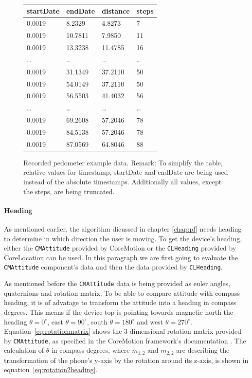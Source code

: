 \begin{center}
\begin{figure}
\begin{tabular}{*{4}{l}}
startDate & endDate & distance & steps\\
\hline
0.0019 & 8.2329 & 4.8273 & 7\\
0.0019 & 10.7811 & 7.9850 & 11\\
0.0019 & 13.3238 & 11.4785 & 16\\
\dots & \dots & \dots & \dots\\
0.0019 & 31.1349 & 37.2110 & 50\\
0.0019 & 54.0149 & 37.2110 & 50\\
0.0019 & 56.5503 & 41.4032 & 56\\
\dots & \dots & \dots & \dots\\
0.0019 & 69.2608 & 57.2046 & 78\\
0.0019 & 84.5138 & 57.2046 & 78\\
0.0019 & 87.0569 & 64.8046 & 88
\end{tabular}
\caption{Recorded pedometer example data.
Remark: To simplify the table, relative values for timestamp, startDate and endDate are being used instead of the absolute timestamps.
Additionally all values, except the steps, are being truncated.}
\label{fig:eval:pedometerExampleData}
\end{figure}
\end{center}


\paragraph{Heading}
As mentioned earlier, the algorithm dicussed in chapter \ref{chap:pf} needs heading to determine in which direction the user is moving.
To get the device's heading, either the \texttt{CMAttitude} provided by CoreMotion or the \texttt{CLHeading} provided by CoreLocation can be used.
In this paragraph we are first going to evaluate the \texttt{CMAttitude} component's data and then the data provided by \texttt{CLHeading}.

As mentioned before the \texttt{CMAttitude} data is being provided as euler angles, quaternions and rotation matrix.
To be able to compare attitude with compass heading, it is of advatage to transform the attitude into a heading in compass degrees.
This means if the device top is pointing towards magnetic north the heading $\theta = 0^{\circ}$,  east $\theta = 90^{\circ}$,  south $\theta = 180^{\circ}$ and west $\theta = 270^{\circ}$.
Equation~\ref{eq:rotationmatrix} shows the 3-dimensional rotation matrix provided by \texttt{CMAttitude}, as specified in the CoreMotion framework's documentation \cite{apple:ios_doc_cm}.
The calculation of $\theta$ in compass degrees, where $m_{1,2}$ and $m_{2,2}$ are describing the transformation of the phone's y-axis by the rotation around its z-axis, is shown in equation~\ref{eq:rotation2heading}.

